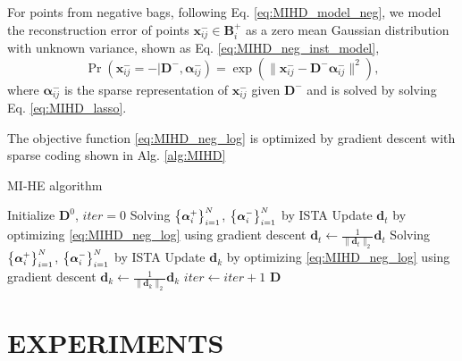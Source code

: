 \documentclass{article}
\begin{document}
	For points from negative bags, following Eq. \eqref{eq:MIHD_model_neg}, we model the reconstruction error of points $\mathbf{x}_{ij}^- \in \mathbf{B}_i^+$ as a zero mean Gaussian distribution with unknown variance, shown as Eq. \eqref{eq:MIHD_neg_inst_model},
	\begin{equation}
	\Pr(\mathbf{x}_{ij}^-=-|\mathbf{D}^-,\boldsymbol{\alpha}_{ij}^-)=\exp\left(\|\mathbf{x}_{ij}^--\mathbf{D}^-\boldsymbol{\alpha}_{ij}^-\|^2\right),
	\label{eq:MIHD_neg_inst_model}
	\end{equation}
	where $\boldsymbol{\alpha}_{ij}^-$ is the sparse representation of $\mathbf{x}_{ij}^-$ given $\mathbf{D}^-$ and is solved by solving Eq. \eqref{eq:MIHD_lasso}. 
	
	The objective function \eqref{eq:MIHD_neg_log} is optimized by gradient descent with sparse coding shown in Alg. \ref{alg:MIHD}
	\begin{algorithm}
		\caption{MI-HE algorithm}
		\begin{algorithmic}[1] 
			\STATE Initialize $\mathbf{D}^0$, $iter = 0$
			\REPEAT
			\STATE Solving $\begin{small}\left\{\boldsymbol{\alpha}^+_i \right\}_{i=1}^{N}\end{small}$, $\begin{small}\left\{\boldsymbol{\alpha}^-_i \right\}_{i=1}^{N}\end{small}$ by ISTA
			\STATE Update  $\mathbf{d}_t$ by optimizing \eqref{eq:MIHD_neg_log} using gradient descent
			\STATE $\mathbf{d}_t\gets\frac{1}{\|\mathbf{d}_t\|_2}\mathbf{d}_t$
			\ENDFOR
			\STATE Solving  $\begin{small}\left\{\boldsymbol{\alpha}^+_i \right\}_{i=1}^{N}\end{small}$, $\begin{small}\left\{\boldsymbol{\alpha}^-_i \right\}_{i=1}^{N}\end{small}$ by ISTA
			\STATE Update  $\mathbf{d}_k$ by optimizing \eqref{eq:MIHD_neg_log} using gradient descent
			\STATE $\mathbf{d}_k\gets\frac{1}{\|\mathbf{d}_k\|_2}\mathbf{d}_k$
			\ENDFOR
			\STATE $iter \gets iter + 1$
			\RETURN $\mathbf{D}$\\
		\end{algorithmic} 
		\label{alg:MIHD}
	\end{algorithm}
	
	
	
	\section{EXPERIMENTS}
	\label{sec:experiments}
	
\end{document}
